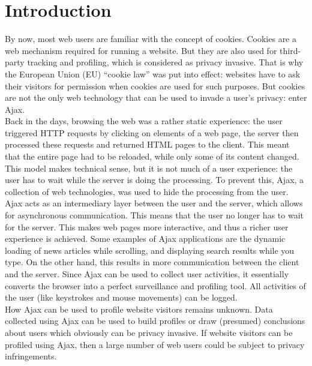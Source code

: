 \section{Introduction}
	
By now, most web users are familiar with the concept of cookies. Cookies are a web mechanism required for running a website. But they are also used for third-party tracking and profiling, which is considered as privacy invasive. That is why the European Union (EU) ``cookie law'' was put into effect: websites have to ask their visitors for permission when cookies are used for such purposes. But cookies are not the only web technology that can be used to invade a user's privacy: enter Ajax.\\
	
Back in the days, browsing the web was a rather static experience: the user triggered HTTP requests by clicking on elements of a web page, the server then processed these requests and returned HTML pages to the client. This meant that the entire page had to be reloaded, while only some of its content changed. This model makes technical sense, but it is not much of a user experience: the user has to wait while the server is doing the processing. To prevent this, Ajax, a collection of web technologies, was used to hide the processing from the user. Ajax acts as an intermediary layer between the user and the server, which allows for asynchronous communication. This means that the user no longer has to wait for the server. This makes web pages more interactive, and thus a richer user experience is achieved. Some examples of Ajax applications are the dynamic loading of news articles while scrolling, and displaying search results while you type. On the other hand, this results in more communication between the client and the server. Since Ajax can be used to collect user activities, it essentially converts the browser into a perfect surveillance and profiling tool. All activities of the user (like keystrokes and mouse movements) can be logged.\\
	
How Ajax can be used to profile website visitors remains unknown. Data collected using Ajax can be used to build profiles or draw (presumed) conclusions about users which obviously can be privacy invasive. If website visitors can be profiled using Ajax, then a large number of web users could be subject to privacy infringements.\\	
	
